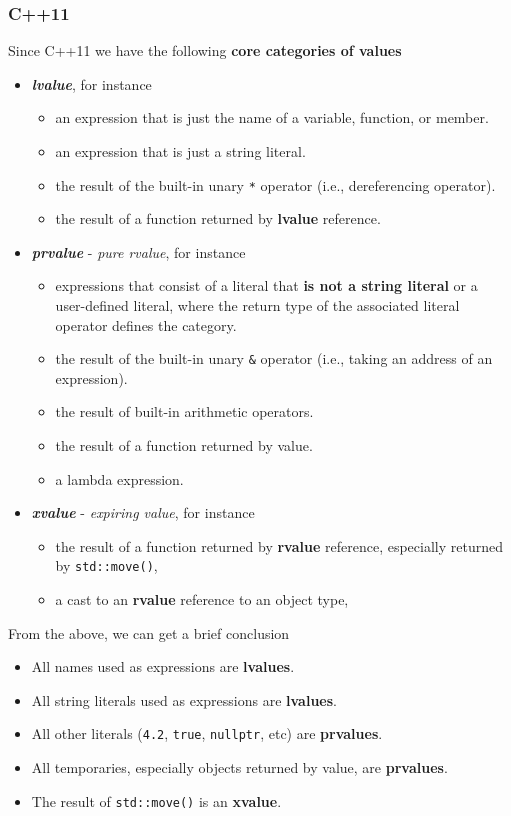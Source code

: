 \documentclass[../main]{subfiles}
\begin{document}
\subsubsection{C++11}
    Since C++11 we have the following \textbf{core categories of values}
\begin{itemize}
    \item \textbf{\textit{lvalue}}, for instance
    \begin{itemize}
        \item an expression that is just the name of a variable, function, or member.
        \item an expression that is just a string literal.
        \item the result of the built-in unary \texttt{*} operator (i.e., dereferencing operator).
        \item the result of a function returned by \textbf{lvalue} reference.
    \end{itemize}
    \item \textbf{\textit{prvalue}} - \textit{pure rvalue}, for instance
    \begin{itemize}
        \item expressions that consist of a literal that \textbf{is not a string literal} or a user-defined literal, where the return type
        of the associated literal operator defines the category.
        \item the result of the built-in unary \texttt{\&} operator (i.e., taking an address of an expression).
        \item the result of built-in arithmetic operators.
        \item the result of a function returned by value.
        \item a lambda expression.
    \end{itemize}
    \item \textbf{\textit{xvalue}} - \textit{expiring value}, for instance
    \begin{itemize}
        \item the result of a function returned by \textbf{rvalue} reference, especially returned by \texttt{std::move()},
        \item a cast to an \textbf{rvalue} reference to an object type,
    \end{itemize}
\end{itemize}

    From the above, we can get a brief conclusion
\begin{itemize}
    \item All names used as expressions are \textbf{lvalues}.
    \item All string literals used as expressions are \textbf{lvalues}.
    \item All other literals (\texttt{4.2}, \texttt{true}, \texttt{nullptr}, etc) are \textbf{prvalues}.
    \item All temporaries, especially objects returned by value, are \textbf{prvalues}.
    \item The result of \texttt{std::move()} is an \textbf{xvalue}.
\end{itemize}
\end{document}
